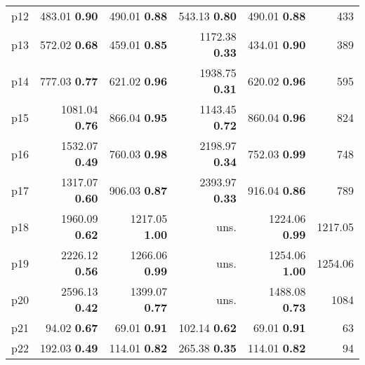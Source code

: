\begin{tabular}{lrrrrr}
\multicolumn{1}{l|}{p12} & {\footnotesize 483.01} \textbf{0.90} & {\footnotesize 490.01} \textbf{0.88} & {\footnotesize 543.13} \textbf{0.80} & {\footnotesize 490.01} \textbf{0.88} & \multicolumn{1}{|r}{433}\\
\multicolumn{1}{l|}{p13} & {\footnotesize 572.02} \textbf{0.68} & {\footnotesize 459.01} \textbf{0.85} & {\footnotesize 1172.38} \textbf{0.33} & {\footnotesize 434.01} \textbf{0.90} & \multicolumn{1}{|r}{389}\\
\multicolumn{1}{l|}{p14} & {\footnotesize 777.03} \textbf{0.77} & {\footnotesize 621.02} \textbf{0.96} & {\footnotesize 1938.75} \textbf{0.31} & {\footnotesize 620.02} \textbf{0.96} & \multicolumn{1}{|r}{595}\\
\multicolumn{1}{l|}{p15} & {\footnotesize 1081.04} \textbf{0.76} & {\footnotesize 866.04} \textbf{0.95} & {\footnotesize 1143.45} \textbf{0.72} & {\footnotesize 860.04} \textbf{0.96} & \multicolumn{1}{|r}{824}\\
\multicolumn{1}{l|}{p16} & {\footnotesize 1532.07} \textbf{0.49} & {\footnotesize 760.03} \textbf{0.98} & {\footnotesize 2198.97} \textbf{0.34} & {\footnotesize 752.03} \textbf{0.99} & \multicolumn{1}{|r}{748}\\
\multicolumn{1}{l|}{p17} & {\footnotesize 1317.07} \textbf{0.60} & {\footnotesize 906.03} \textbf{0.87} & {\footnotesize 2393.97} \textbf{0.33} & {\footnotesize 916.04} \textbf{0.86} & \multicolumn{1}{|r}{789}\\
\multicolumn{1}{l|}{p18} & {\footnotesize 1960.09} \textbf{0.62} & {\footnotesize 1217.05} \textbf{1.00} & uns. & {\footnotesize 1224.06} \textbf{0.99} & \multicolumn{1}{|r}{1217.05}\\
\multicolumn{1}{l|}{p19} & {\footnotesize 2226.12} \textbf{0.56} & {\footnotesize 1266.06} \textbf{0.99} & uns. & {\footnotesize 1254.06} \textbf{1.00} & \multicolumn{1}{|r}{1254.06}\\
\multicolumn{1}{l|}{p20} & {\footnotesize 2596.13} \textbf{0.42} & {\footnotesize 1399.07} \textbf{0.77} & uns. & {\footnotesize 1488.08} \textbf{0.73} & \multicolumn{1}{|r}{1084}\\
\multicolumn{1}{l|}{p21} & {\footnotesize 94.02} \textbf{0.67} & {\footnotesize 69.01} \textbf{0.91} & {\footnotesize 102.14} \textbf{0.62} & {\footnotesize 69.01} \textbf{0.91} & \multicolumn{1}{|r}{63}\\
\multicolumn{1}{l|}{p22} & {\footnotesize 192.03} \textbf{0.49} & {\footnotesize 114.01} \textbf{0.82} & {\footnotesize 265.38} \textbf{0.35} & {\footnotesize 114.01} \textbf{0.82} & \multicolumn{1}{|r}{94}\\

\end{tabular}
